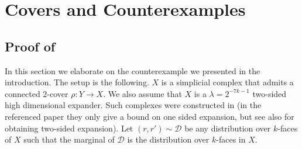 \section{Covers and Counterexamples}
\subsection{Proof of } \label{sec:proof-of-counterexample}
In this section we elaborate on the counterexample we presented in the introduction. The setup is the following. \(X\) is a simplicial complex that admits a connected \(2\)-cover \(\rho:Y \to X\). We also assume that \(X\) is a \(\lambda=2^{-7k-1}\) two-sided high dimensional expander. Such complexes were constructed in \cite{LubotzkySV2005b} (in the referenced paper they only give a bound on one sided expansion, but see also \cite{DinurK2017} for obtaining two-sided expansion). Let \((r,r') \sim \mathcal{D}\) be any distribution over \(k\)-faces of \(X\) such that the marginal of \(\mathcal{D}\) is the distribution over \(k\)-faces in \(X\). 


